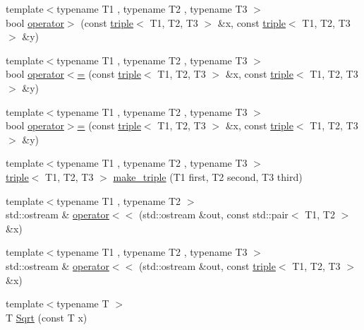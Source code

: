 \begin{DoxyCompactItemize}
\item 
{\footnotesize template$<$typename T1 , typename T2 , typename T3 $>$ }\\bool \hyperlink{namespace_c_o_n_t_r_a_l_i_g_n_ae3eb2ccb80d117e609ecc584ca71181f}{operator$>$} (const \hyperlink{struct_c_o_n_t_r_a_l_i_g_n_1_1triple}{triple}$<$ T1, T2, T3 $>$ \&x, const \hyperlink{struct_c_o_n_t_r_a_l_i_g_n_1_1triple}{triple}$<$ T1, T2, T3 $>$ \&y)
\item 
{\footnotesize template$<$typename T1 , typename T2 , typename T3 $>$ }\\bool \hyperlink{namespace_c_o_n_t_r_a_l_i_g_n_a8d549020d197328238ec07aec158d838}{operator$<$=} (const \hyperlink{struct_c_o_n_t_r_a_l_i_g_n_1_1triple}{triple}$<$ T1, T2, T3 $>$ \&x, const \hyperlink{struct_c_o_n_t_r_a_l_i_g_n_1_1triple}{triple}$<$ T1, T2, T3 $>$ \&y)
\item 
{\footnotesize template$<$typename T1 , typename T2 , typename T3 $>$ }\\bool \hyperlink{namespace_c_o_n_t_r_a_l_i_g_n_af2698ca3552c349853f1d45c74399d52}{operator$>$=} (const \hyperlink{struct_c_o_n_t_r_a_l_i_g_n_1_1triple}{triple}$<$ T1, T2, T3 $>$ \&x, const \hyperlink{struct_c_o_n_t_r_a_l_i_g_n_1_1triple}{triple}$<$ T1, T2, T3 $>$ \&y)
\item 
{\footnotesize template$<$typename T1 , typename T2 , typename T3 $>$ }\\\hyperlink{struct_c_o_n_t_r_a_l_i_g_n_1_1triple}{triple}$<$ T1, T2, T3 $>$ \hyperlink{namespace_c_o_n_t_r_a_l_i_g_n_a98175ddcaf753882eb5f92de09f9108f}{make\+\_\+triple} (T1 first, T2 second, T3 third)
\item 
{\footnotesize template$<$typename T1 , typename T2 $>$ }\\std\+::ostream \& \hyperlink{namespace_c_o_n_t_r_a_l_i_g_n_af60b1eb5579c95763c8241ab707b917e}{operator$<$$<$} (std\+::ostream \&out, const std\+::pair$<$ T1, T2 $>$ \&x)
\item 
{\footnotesize template$<$typename T1 , typename T2 , typename T3 $>$ }\\std\+::ostream \& \hyperlink{namespace_c_o_n_t_r_a_l_i_g_n_a37f6d4fc947c02293236890815321e35}{operator$<$$<$} (std\+::ostream \&out, const \hyperlink{struct_c_o_n_t_r_a_l_i_g_n_1_1triple}{triple}$<$ T1, T2, T3 $>$ \&x)
\item 
{\footnotesize template$<$typename T $>$ }\\T \hyperlink{namespace_c_o_n_t_r_a_l_i_g_n_ab021053662bde52f88f0e83578579559}{Sqrt} (const T x)
\item 

\end{DoxyCompactItemize}
